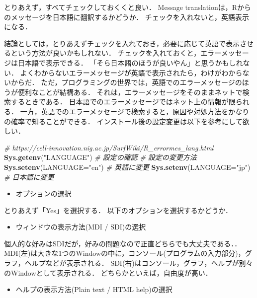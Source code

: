 \documentclass[
]{article}
\newenvironment{Shaded}{\begin{snugshade}}{\end{snugshade}}
\newcommand{\AttributeTok}[1]{\textcolor[rgb]{0.13,0.29,0.53}{#1}}
\newcommand{\CommentTok}[1]{\textcolor[rgb]{0.56,0.35,0.01}{\textit{#1}}}
\newcommand{\FunctionTok}[1]{\textcolor[rgb]{0.13,0.29,0.53}{\textbf{#1}}}
\newcommand{\NormalTok}[1]{#1}
\newcommand{\StringTok}[1]{\textcolor[rgb]{0.31,0.60,0.02}{#1}}
\providecommand{\tightlist}{%
  \setlength{\itemsep}{0pt}\setlength{\parskip}{0pt}}
\begin{document}
とりあえず，すべてチェックしておくくと良い．
Message translationは，Rからのメッセージを日本語に翻訳するかどうか．
チェックを入れないと，英語表示になる．

結論としては，とりあえずチェックを入れておき，必要に応じて英語で表示させるという方法が良いかもしれない．
チェックを入れておくと，エラーメッセージは日本語で表示できる．
「そら日本語のほうが良いやん」と思うかもしれない．
よくわからないエラーメッセージが英語で表示されたら，わけがわからないからだ．
ただ，プログラミングの世界では，英語でのエラーメッセージのほうが便利なことが結構ある．
それは，エラーメッセージをそのままネットで検索するときである．
日本語でのエラーメッセージではネット上の情報が限られる．
一方，英語でのエラーメッセージで検索すると，原因や対処方法をかなりの確率で知ることができる．
インストール後の設定変更は以下を参考にして欲しい．

\begin{Shaded}
\begin{Highlighting}[]
  \CommentTok{\# https://cell{-}innovation.nig.ac.jp/SurfWiki/R\_errormes\_lang.html}
  \FunctionTok{Sys.getenv}\NormalTok{(}\StringTok{"LANGUAGE"}\NormalTok{) }\CommentTok{\# 設定の確認}
  \CommentTok{\# 設定の変更方法}
  \FunctionTok{Sys.setenv}\NormalTok{(}\AttributeTok{LANGUAGE=}\StringTok{"en"}\NormalTok{) }\CommentTok{\# 英語に変更}
  \FunctionTok{Sys.setenv}\NormalTok{(}\AttributeTok{LANGUAGE=}\StringTok{"jp"}\NormalTok{) }\CommentTok{\# 日本語に変更}
\end{Highlighting}
\end{Shaded}

\begin{itemize}
\tightlist
\item
  オプションの選択
\end{itemize}

とりあえず「Yes」を選択する．
以下のオプションを選択するかどうか．

\begin{itemize}
\tightlist
\item
  ウィンドウの表示方法(MDI / SDI)の選択
\end{itemize}

個人的な好みはSDIだが，好みの問題なので正直どちらでも大丈夫である．．
MDI(左)は大きな1つのWindowの中に，コンソール(プログラムの入力部分)，グラフ，ヘルプなどが表示される．
SDI(右)はコンソール，グラフ，ヘルプが別々のWindowとして表示される．
どちらかといえば，自由度が高い．

\begin{itemize}
\tightlist
\item
  ヘルプの表示方法(Plain text / HTML help)の選択
\end{itemize}
\end{document}
